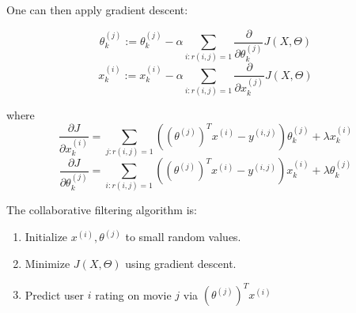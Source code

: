     One can then apply gradient descent: 

    \begin{equation}
        \theta^{(j)}_k := \theta^{(j)}_k - \alpha   \sum_{i:r(i,j) = 1}^{} \frac{\partial }{\partial \theta_k^{(j)}} J(X, \Theta)
        \label{eq:collab-filter-reg-grad-desc-theta}
    \end{equation}
    \begin{equation}
        x^{(i)}_k := x^{(i)}_k - \alpha   \sum_{i:r(i,j) = 1}^{} \frac{\partial }{\partial x_k^{(j)}} J(X, \Theta) 
        \label{eq:collab-filter-reg-grad-desc-x}
    \end{equation}

    where
    \begin{equation}
\frac{\partial J}{\partial x_k^{(i)}} = \sum_{j:r(i,j)=1}\left((\theta^{(j)})^T 
x^{(i)} -y^{(i,j)}\right)\theta_k^{(j)}+\lambda x_k^{(i)}
        \label{eq:collab-filter-grad-Jx}
    \end{equation}
    \begin{equation}
\frac{\partial J}{\partial \theta_k^{(j)}} = \sum_{i:r(i,j)=1}\left((\theta^{(j)})^T x^{(i)} -y^{(i,j)}\right) x_k^{(i)}+\lambda\theta_k^{(j)}
        \label{eq:collab-filter-grad-Jtheta}
    \end{equation}


    The collaborative filtering algorithm is:
    \begin{enumerate}
        \item Initialize $x^{(i)}, \theta^{(j)}$ to small random values. 
        \item Minimize $J(X, \Theta)$ using gradient descent.
        \item Predict user $i$ rating on movie $j$ via $(\theta^{(j)})^T x^{(i)}$
    \end{enumerate}
